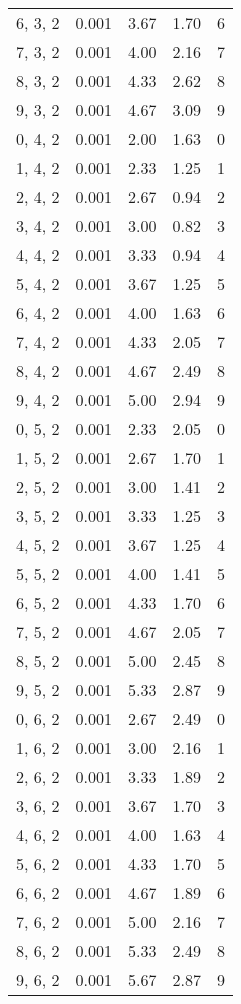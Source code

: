\documentclass[12pt]{article}
\begin{document}
\begin{tabular}{c || c || c | c | c}
6, 3, 2 & 0.001 & 3.67 & 1.70 & 6 \\
7, 3, 2 & 0.001 & 4.00 & 2.16 & 7 \\
8, 3, 2 & 0.001 & 4.33 & 2.62 & 8 \\
9, 3, 2 & 0.001 & 4.67 & 3.09 & 9 \\
0, 4, 2 & 0.001 & 2.00 & 1.63 & 0 \\
1, 4, 2 & 0.001 & 2.33 & 1.25 & 1 \\
2, 4, 2 & 0.001 & 2.67 & 0.94 & 2 \\
3, 4, 2 & 0.001 & 3.00 & 0.82 & 3 \\
4, 4, 2 & 0.001 & 3.33 & 0.94 & 4 \\
5, 4, 2 & 0.001 & 3.67 & 1.25 & 5 \\
6, 4, 2 & 0.001 & 4.00 & 1.63 & 6 \\
7, 4, 2 & 0.001 & 4.33 & 2.05 & 7 \\
8, 4, 2 & 0.001 & 4.67 & 2.49 & 8 \\
9, 4, 2 & 0.001 & 5.00 & 2.94 & 9 \\
0, 5, 2 & 0.001 & 2.33 & 2.05 & 0 \\
1, 5, 2 & 0.001 & 2.67 & 1.70 & 1 \\
2, 5, 2 & 0.001 & 3.00 & 1.41 & 2 \\
3, 5, 2 & 0.001 & 3.33 & 1.25 & 3 \\
4, 5, 2 & 0.001 & 3.67 & 1.25 & 4 \\
5, 5, 2 & 0.001 & 4.00 & 1.41 & 5 \\
6, 5, 2 & 0.001 & 4.33 & 1.70 & 6 \\
7, 5, 2 & 0.001 & 4.67 & 2.05 & 7 \\
8, 5, 2 & 0.001 & 5.00 & 2.45 & 8 \\
9, 5, 2 & 0.001 & 5.33 & 2.87 & 9 \\
0, 6, 2 & 0.001 & 2.67 & 2.49 & 0 \\
1, 6, 2 & 0.001 & 3.00 & 2.16 & 1 \\
2, 6, 2 & 0.001 & 3.33 & 1.89 & 2 \\
3, 6, 2 & 0.001 & 3.67 & 1.70 & 3 \\
4, 6, 2 & 0.001 & 4.00 & 1.63 & 4 \\
5, 6, 2 & 0.001 & 4.33 & 1.70 & 5 \\
6, 6, 2 & 0.001 & 4.67 & 1.89 & 6 \\
7, 6, 2 & 0.001 & 5.00 & 2.16 & 7 \\
8, 6, 2 & 0.001 & 5.33 & 2.49 & 8 \\
9, 6, 2 & 0.001 & 5.67 & 2.87 & 9 \\

\end{tabular}
\end{document}
